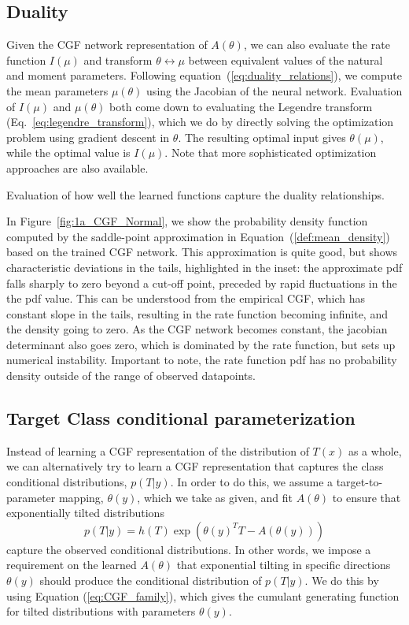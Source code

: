 \documentclass[11pt]{article}      %
\begin{document}
\subsection{Duality}

Given the CGF network representation of $A(\theta)$, we can also evaluate the rate function $I(\mu)$ and transform $\theta \leftrightarrow \mu$ between equivalent values of the natural and moment parameters.
Following equation~(\ref{eq:duality_relations}), we compute the mean parameters $\mu(\theta)$ using the Jacobian of the neural network. 
Evaluation of $I(\mu)$ and $\mu(\theta)$ both come down to evaluating the Legendre transform (Eq.~\ref{eq:legendre_transform}), which we do by directly solving the optimization problem using gradient descent in $\theta$.
The resulting optimal input gives $\theta(\mu)$, while the optimal value is $I(\mu)$.
Note that more sophisticated optimization approaches are also available.


Evaluation of how well the learned functions capture the duality relationships.





In Figure~\ref{fig:1a_CGF_Normal}, we show the probability density function computed by the saddle-point approximation in Equation~(\ref{def:mean_density}) based on the trained CGF network.
This approximation is quite good, but shows characteristic deviations in the tails, highlighted in the inset:
the approximate pdf falls sharply to zero beyond a cut-off point, preceded by rapid fluctuations in the the pdf value.
This can be understood from the empirical CGF, which has constant slope in the tails, resulting in the rate function becoming infinite, and the density going to zero.
As the CGF network becomes constant, the jacobian determinant also goes zero, which is dominated by the rate function, but sets up numerical instability.
Important to note, the rate function pdf has no probability density outside of the range of observed datapoints.




\subsection{Target Class conditional parameterization}

Instead of learning a CGF representation of the distribution of $T(x)$ as a whole, we can alternatively try to learn a CGF representation that captures the class conditional distributions, $p(T|y)$.
In order to do this, we assume a target-to-parameter mapping, $\theta(y)$, which we take as given, and fit $A(\theta)$ to ensure that exponentially tilted distributions
\begin{equation}
  p(T|y) = h(T) \exp(\theta(y)^T T - A(\theta(y))) \label{eq:class_conditional}
\end{equation}
capture the observed conditional distributions.
In other words, we impose a requirement on the learned $A(\theta)$ that exponential tilting in specific directions $\theta(y)$ should produce the conditional distribution of $p(T|y)$.
We do this by using Equation (\ref{eq:CGF_family}), which gives the cumulant generating function for tilted distributions with parameters $\theta(y)$.
\end{document}
